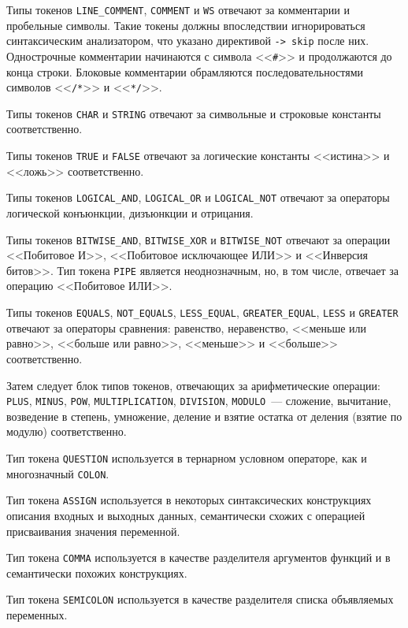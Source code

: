 \documentclass[times,specification,annotation]{style/itmo-student-thesis/itmo-student-thesis}
\begin{document}
Типы токенов \texttt{LINE\_COMMENT}, \texttt{COMMENT} и \texttt{WS} отвечают за комментарии и пробельные символы. Такие токены должны впоследствии игнорироваться синтаксическим анализатором, что указано директивой \texttt{-> skip} после них. Однострочные комментарии начинаются с символа <<\texttt{\#}>> и продолжаются до конца строки. Блоковые комментарии обрамляются последовательностями символов <<\texttt{/*}>> и <<\texttt{*/}>>.

Типы токенов \texttt{CHAR} и \texttt{STRING} отвечают за символьные и строковые константы соответственно.

Типы токенов \texttt{TRUE} и \texttt{FALSE} отвечают за логические константы <<истина>> и <<ложь>> соответственно.

Типы токенов \texttt{LOGICAL\_AND}, \texttt{LOGICAL\_OR} и \texttt{LOGICAL\_NOT} отвечают за операторы логической конъюнкции, дизъюнкции и отрицания. 

Типы токенов \texttt{BITWISE\_AND}, \texttt{BITWISE\_XOR} и \texttt{BITWISE\_NOT} отвечают за операции <<Побитовое И>>, <<Побитовое исключающее ИЛИ>> и <<Инверсия битов>>. Тип токена \texttt{PIPE} является неоднозначным, но, в том числе, отвечает за операцию <<Побитовое ИЛИ>>.

Типы токенов \texttt{EQUALS}, \texttt{NOT\_EQUALS}, \texttt{LESS\_EQUAL}, \texttt{GREATER\_EQUAL}, \texttt{LESS} и \texttt{GREATER} отвечают за операторы сравнения: равенство, неравенство, <<меньше или равно>>, <<больше или равно>>, <<меньше>> и <<больше>> соответственно.

Затем следует блок типов токенов, отвечающих за арифметические операции: \texttt{PLUS}, \texttt{MINUS}, \texttt{POW}, \texttt{MULTIPLICATION}, \texttt{DIVISION}, \texttt{MODULO}~--- сложение, вычитание, возведение в степень, умножение, деление и взятие остатка от деления (взятие по модулю) соответственно.

Тип токена \texttt{QUESTION} используется в тернарном условном операторе, как и многозначный \texttt{COLON}.

Тип токена \texttt{ASSIGN} используется в некоторых синтаксических конструкциях описания входных и выходных данных, семантически схожих с операцией присваивания значения переменной.

Тип токена \texttt{COMMA} используется в качестве разделителя аргументов функций и в семантически похожих конструкциях.

Тип токена \texttt{SEMICOLON} используется в качестве разделителя списка объявляемых переменных.
\end{document}

